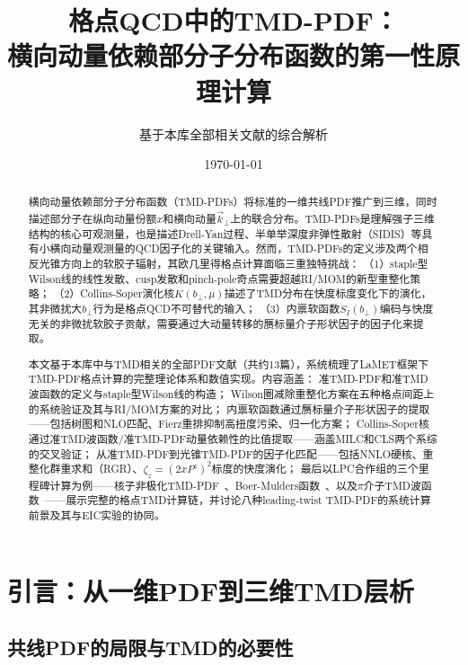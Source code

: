\documentclass[12pt,a4paper]{ctexart}
\title{\heiti 格点QCD中的TMD-PDF：\\
横向动量依赖部分子分布函数的第一性原理计算}
\author{基于本库全部相关文献的综合解析}
\date{\today}
\theoremstyle{definition}
\begin{document}
\maketitle

\begin{abstract}
\noindent
横向动量依赖部分子分布函数（TMD-PDFs）将标准的一维共线PDF推广到三维，同时描述部分子在纵向动量份额$x$和横向动量$\vec{k}_\perp$上的联合分布。TMD-PDFs是理解强子三维结构的核心可观测量，也是描述Drell-Yan过程、半单举深度非弹性散射（SIDIS）等具有小横向动量观测量的QCD因子化的关键输入。然而，TMD-PDFs的定义涉及两个相反光锥方向上的软胶子辐射，其欧几里得格点计算面临三重独特挑战：
（1）staple型Wilson线的线性发散、cusp发散和pinch-pole奇点需要超越RI/MOM的新型重整化策略；
（2）Collins-Soper演化核$K(b_\perp,\mu)$描述了TMD分布在快度标度变化下的演化，其非微扰大$b_\perp$行为是格点QCD不可替代的输入；
（3）内禀软函数$S_I(b_\perp)$编码与快度无关的非微扰软胶子贡献，需要通过大动量转移的赝标量介子形状因子的因子化来提取。

本文基于本库中与TMD相关的全部PDF文献（共约13篇），系统梳理了LaMET框架下TMD-PDF格点计算的完整理论体系和数值实现。内容涵盖：
准TMD-PDF和准TMD波函数的定义与staple型Wilson线的构造；
Wilson圈减除重整化方案在五种格点间距上的系统验证及其与RI/MOM方案的对比；
内禀软函数通过赝标量介子形状因子的提取——包括树图和NLO匹配、Fierz重排抑制高扭度污染、归一化方案；
Collins-Soper核通过准TMD波函数/准TMD-PDF动量依赖性的比值提取——涵盖MILC和CLS两个系综的交叉验证；
从准TMD-PDF到光锥TMD-PDF的因子化匹配——包括NNLO硬核、重整化群重求和（RGR）、$\zeta_z=(2xP^z)^2$标度的快度演化；
最后以LPC合作组的三个里程碑计算为例——核子非极化TMD-PDF~\cite{He2024unpolTMD}、Boer-Mulders函数~\cite{Ma2025BoerMulders}、以及$\pi$介子TMD波函数~\cite{Chu2023TMDWF}——展示完整的格点TMD计算链，并讨论八种leading-twist TMD-PDF的系统计算前景及其与EIC实验的协同。
\end{abstract}

\tableofcontents
\newpage

\section{引言：从一维PDF到三维TMD层析}

\subsection{共线PDF的局限与TMD的必要性}
\end{document}
